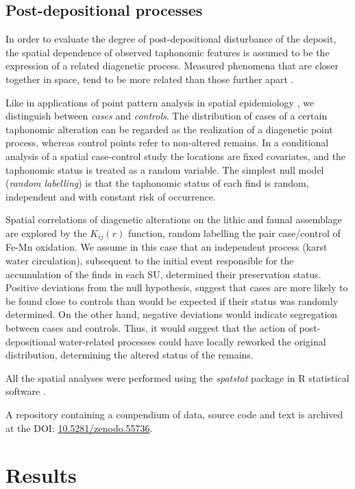 \documentclass[review,authoryear]{elsarticle} %
\begin{document}
\subsection{Post-depositional processes}

In order to evaluate the degree of post-depositional disturbance of the deposit, the spatial dependence of observed taphonomic features is assumed to be the expression of a related diagenetic process. Measured phenomena that are closer together in space, tend to be more related than those further apart \citep{Tobler1970}.

Like in applications of point pattern analysis in spatial epidemiology \citep{Diggle2003,Gatrell1996}, we distinguish between \emph{cases} and \emph{controls}. The distribution of cases of a certain taphonomic alteration can be regarded as the realization of a diagenetic point process, whereas control points refer to non-altered remains. In a conditional analysis of a spatial case-control study the locations are fixed covariates, and the taphonomic status is treated as a random variable. The simplest null model (\emph{random labelling}) is that the taphonomic status of each find is random, independent and with constant risk of occurrence.

Spatial correlations of diagenetic alterations on the lithic and faunal assemblage are explored by the $K_{ij}(r)$ function, random labelling the pair case/control of Fe-Mn oxidation. We assume in this case that an independent process (karst water circulation), subsequent to the initial event responsible for the accumulation of the finds in each SU, determined their preservation status. Positive deviations from the null hypothesis, suggest that cases are more likely to be found close to controls than would be expected if their status was randomly determined. On the other hand, negative deviations would indicate segregation between cases and controls. Thus, it would suggest that the action of post-depositional water-related processes could have locally reworked the original distribution, determining the altered status of the remains.

All the spatial analyses were performed using the \emph{spatstat} package \citep{Baddeley2015} in \textsf{R} statistical software \citep{RCoreTeam2015}.

A repository containing a compendium of data, source code and text \citep{Marwick2016} is archived at the DOI: \href{http://dx.doi.org/10.5281/zenodo.55736}{10.5281/zenodo.55736}.

\section{Results}
\end{document}

